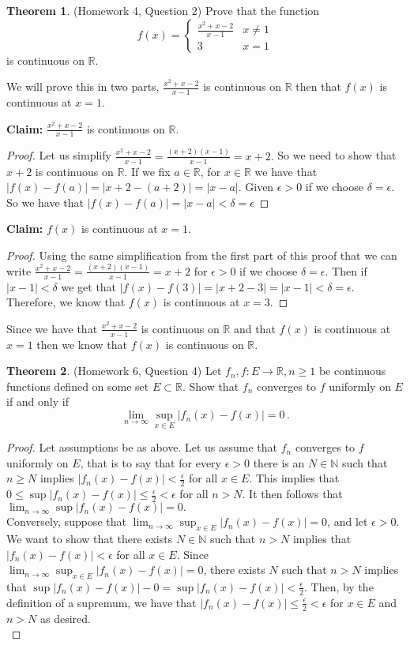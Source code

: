 \documentclass{article}
\theoremstyle{definition}
\newtheorem{theorem}{Theorem}
\newcommand{\N}{\mathbb{N}}
\newcommand{\R}{\mathbb{R}}
\begin{document}
\pagebreak
\begin{theorem}
(Homework 4, Question 2) Prove that the function 
\[
f(x) = \begin{cases} \frac{x^2 + x - 2}{x - 1} & x \neq 1 \\ 3 & x = 1 \end{cases}
\]
is continuous on $\R$. 
\end{theorem}

We will prove this in two parts, $\frac{x^2+x-2}{x-1}$ is continuous on $\R$ then that $f(x)$ is continuous at $x = 1$.

\textbf{Claim: } $\frac{x^2+x-2}{x-1}$ is continuous on $\R$.
\begin{proof}
Let us simplify $\frac{x^2+x-2}{x-1} = \frac{(x+2)(x-1)}{x-1} = x+2.$ So we need to show that $x+2$ is continuous on $\R$. If we fix $a\in \R$, for $x\in \R$ we have that $|f(x)-f(a)| = |x+2-(a+2)| = |x-a|$. Given $\epsilon > 0$ if we choose $\delta = \epsilon.$ So we have that $|f(x) - f(a)| = |x - a| < \delta = \epsilon$
\end{proof}
\textbf{Claim:} $f(x)$ is continuous at $x=1.$
\begin{proof}
Using the same simplification from the first part of this proof that we can write $\frac{x^2+x-2}{x-1} = \frac{(x+2)(x-1)}{x-1} = x+2$ for $\epsilon > 0$ if we choose $\delta = \epsilon$. Then if $|x - 1| < \delta$ we get that $|f(x) - f(3)| = |x + 2 - 3| = |x - 1| < \delta = \epsilon.$ Therefore, we know that $f(x)$ is continuous at $x = 3.$
\end{proof} Since we have that $\frac{x^2+x-2}{x-1}$ is continuous on $\R$ and that $f(x)$ is continuous at $x = 1$ then we know that $f(x)$ is continuous on $\R.$

\pagebreak
\begin{theorem}
(Homework 6, Question 4) Let $f_n, f : E \to \R, n \geq 1$ be continuous functions defined on some set $E \subset \R$. Show that $f_n$ converges to $f$ uniformly on $E$ if and only if 
\[
\lim_{n \to \infty} \sup_{x \in E} | f_n(x) - f(x)| = 0 \, . 
\]
\end{theorem}

\begin{proof}
Let assumptions be as above. Let us assume that $f_n$ converges to $f$ uniformly on $E$, that is to say that for every $\epsilon > 0$ there is an $N\in \N$ such that $n \geq N$ implies $|f_n(x) - f(x)| < \frac{\epsilon}{2}$ for all $x\in E.$ This implies that $0 \leq \sup|f_n(x) - f(x)| \leq \frac{\epsilon}{2} < \epsilon$ for all $n > N$. It then follows that $\lim_{n\to \infty} \sup|f_n(x)-f(x)| = 0.$\\
Conversely, suppose that $\lim_{n \to \infty} \sup_{x \in E} | f_n(x) - f(x)| = 0$, and let $\epsilon > 0.$ We want to show that there exists $N \in \N$ such that $n > N$ implies that $|f_n(x) - f(x)| < \epsilon$ for all $x\in E$. Since $\lim_{n \to \infty} \sup_{x \in E} | f_n(x) - f(x)| = 0$, there exists $N$ such that $n > N$ implies that $\sup|f_n(x)-f(x)| - 0 = \sup|f_n(x)-f(x)| < \frac{\epsilon}{2}.$ Then, by the definition of a supremum, we have that $|f_n(x) - f(x)| \leq \frac{\epsilon}{2}<\epsilon$ for $x \in E$ and $n > N$ as desired.\\
\end{proof}
\end{document}
